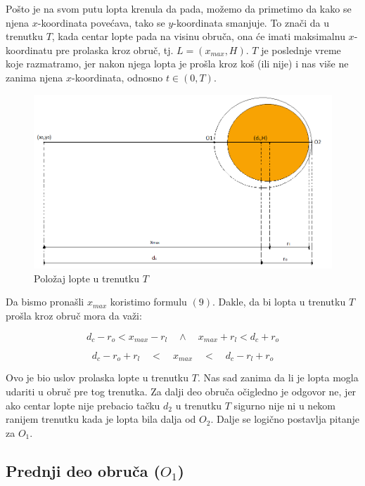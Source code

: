 \documentclass[a4paper, 12pt]{article}
\begin{document}
Pošto je na svom putu lopta krenula da pada, možemo da primetimo da kako se njena $x$-koordinata povećava, tako se $y$-koordinata smanjuje. To znači da u trenutku $T$, kada centar lopte pada na visinu obruča, ona će imati maksimalnu $x$-koordinatu pre prolaska kroz obruč, tj. $L = (x_{max},H)$. $T$ je poslednje vreme koje razmatramo, jer nakon njega lopta je prošla kroz koš (ili nije) i nas više ne zanima njena $x$-koordinata, odnosno $t \in (0,T)$.
\begin{figure}[h]
\hspace*{1.6cm}
\includegraphics[scale=0.3]{pic3}
\caption{Položaj lopte u trenutku $T$}
\end{figure}

 Da bismo pronašli $x_{max}$ koristimo formulu $(9)$. Dakle, da bi lopta u trenutku $T$ prošla kroz obruč mora da važi:

\[ d_c - r_o < x_{max} - r_l \quad \land \quad x_{max} + r_l < d_c + r_o \]

\begin{equation}
d_c - r_o + r_l \quad < \quad x_{max} \quad < \quad d_c - r_l + r_o
\end{equation}


Ovo je bio uslov prolaska lopte u trenutku $T$. Nas sad zanima da li je lopta mogla udariti u obruč pre tog trenutka. Za dalji deo obruča očigledno je odgovor ne, jer ako centar lopte nije prebacio tačku $d_2$ u trenutku $T$ sigurno nije ni u nekom ranijem trenutku kada je lopta bila dalja od $O_2$. Dalje se logično postavlja pitanje za $O_1$.



\subsection{Prednji deo obruča ($O_1$)}
\end{document}
